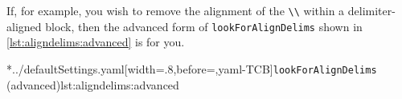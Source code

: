 	\begin{cmhtcbraster}
	\end{cmhtcbraster}

	If, for example, you wish to remove the alignment of the \lstinline!\\! within a
	delimiter-aligned block, then the advanced form of \texttt{lookForAlignDelims} shown in
	\cref{lst:aligndelims:advanced} is for you.

	\cmhlistingsfromfile*[style=lookForAlignDelims]*{../defaultSettings.yaml}[width=.8\linewidth,before=\centering,yaml-TCB]{\texttt{lookForAlignDelims} (advanced)}{lst:aligndelims:advanced}

